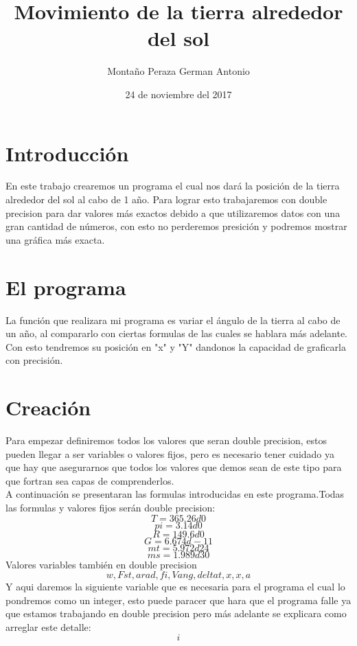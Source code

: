 \documentclass{article}
\date{24 de noviembre del 2017}
\title{Movimiento de la tierra alrededor del sol}
\author{Montaño Peraza German Antonio}
\begin{document}
\maketitle
\section{Introducción}
En este trabajo crearemos un programa el cual nos dará la posición de la tierra alrededor del sol al cabo de 1 año. Para lograr esto trabajaremos con double precision para dar valores más exactos debido a que utilizaremos datos con una gran cantidad de números, con esto no perderemos presición y podremos mostrar una gráfica más exacta.
\section{El programa}
La función que realizara mi programa es variar el ángulo de la tierra al cabo de un año, al compararlo con ciertas formulas de las cuales se hablara más adelante. Con esto tendremos su posición en "x" y "Y" dandonos la capacidad de graficarla con precisión.
\section{Creación}
Para empezar definiremos todos los valores que seran double precision, estos pueden llegar a ser variables o valores fijos, pero es necesario tener cuidado ya que hay que asegurarnos que todos los valores que demos sean de este tipo para que fortran sea capas de comprenderlos.\\
A continuación se presentaran las formulas introducidas en este programa.Todas las formulas y valores fijos serán double precision:
\[T=365.26d0\]
\[pi=3.14d0\]
\[R=149.6d0\]
\[G=6.674d-11\]
\[mt=5.972d24\]
\[ms=1.989d30\]
Valores variables también en double precision
\[w,Fst,arad,fi,Vang,deltat,x,x,a\]
Y aqui daremos la siguiente variable que es necesaria para el programa el cual lo pondremos como un integer, esto puede paracer que hara que el programa falle ya que estamos trabajando en double precision pero más adelante se explicara como arreglar este detalle:
\[i\]
\end{document}
